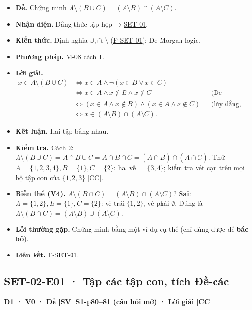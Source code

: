 \documentclass[
  10pt,
  twoside,openany]{book}
\begin{document}
\begin{itemize}
\item
  \textbf{Đề.} Chứng minh
  \(A\setminus(B\cup C)=(A\setminus B)\cap(A\setminus C)\).
\item
  \textbf{Nhận diện.} Đẳng thức tập hợp →
  \protect\hyperlink{SET-01}{SET-01}.
\item
  \textbf{Kiến thức.} Định nghĩa \(\cup,\cap,\setminus\)
  (\protect\hyperlink{F-SET-01}{F-SET-01}); De Morgan logic.
\item
  \textbf{Phương pháp.} \protect\hyperlink{M-08}{M-08} cách 1.
\item
  \textbf{Lời giải.} \[
  \begin{aligned}
  x\in A\setminus(B\cup C)&\Leftrightarrow x\in A\wedge\neg(x\in B\vee x\in C)\\
  &\Leftrightarrow x\in A\wedge x\notin B\wedge x\notin C &&\text{(De Morgan)}\\
  &\Leftrightarrow(x\in A\wedge x\notin B)\wedge(x\in A\wedge x\notin C) &&\text{(lũy đẳng, giao hoán, kết hợp)}\\
  &\Leftrightarrow x\in(A\setminus B)\cap(A\setminus C).
  \end{aligned}
  \]
\item
  \textbf{Kết luận.} Hai tập bằng nhau.
\item
  \textbf{Kiểm tra.} Cách 2:
  \(A\setminus(B\cup C)=A\cap\overline{B\cup C}=A\cap\bar B\cap\bar C=(A\cap\bar B)\cap(A\cap\bar C)\).
  Thử \(A=\{1,2,3,4\},B=\{1\},C=\{2\}\): hai vế \(=\{3,4\}\); kiểm tra
  vét cạn trên mọi bộ tập con của \(\{1,2,3\}\) {[}CC{]}.
\item
  \textbf{Biến thể (V4).}
  \(A\setminus(B\cap C)=(A\setminus B)\cap(A\setminus C)\)?
  \textbf{Sai}: \(A=\{1,2\},B=\{1\},C=\{2\}\): vế trái \(\{1,2\}\), vế
  phải \(\emptyset\). Đúng là
  \(A\setminus(B\cap C)=(A\setminus B)\cup(A\setminus C)\).
\item
  \textbf{Lỗi thường gặp.} Chứng minh bằng một ví dụ cụ thể (chỉ dùng
  được để \textbf{bác bỏ}).
\item
  \textbf{Liên kết.} \protect\hyperlink{F-SET-01}{F-SET-01}.
\end{itemize}

\hypertarget{SET-02-E01}{%
\subsection{SET-02-E01 · Tập các tập con, tích
Đề-các}\label{SET-02-E01}}

\textbf{D1 · V0 · Đề {[}SV{]} S1-p80--81 (câu hỏi mở) · Lời giải
{[}CC{]}}
\end{document}
